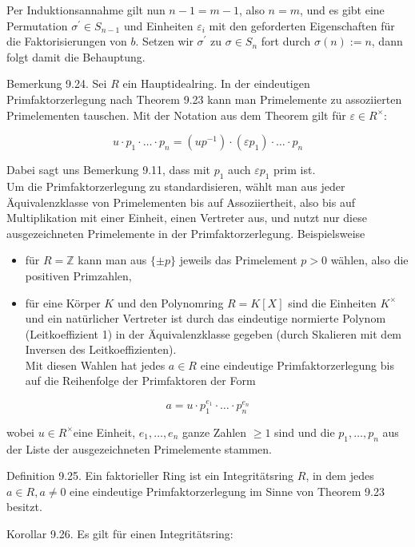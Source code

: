 \documentclass[10pt, letterpaper]{article}
\begin{document}
Per Induktionsannahme gilt nun $n-1=m-1$, also $n=m$, und es gibt eine Permutation $\sigma^{\prime} \in S_{n-1}$ und Einheiten $\varepsilon_{i}$ mit den geforderten Eigenschaften für die Faktorisierungen von $b$. Setzen wir $\sigma^{\prime}$ zu $\sigma \in S_{n}$ fort durch $\sigma(n):=n$, dann folgt damit die Behauptung.

Bemerkung 9.24. Sei $R$ ein Hauptidealring. In der eindeutigen Primfaktorzerlegung nach Theorem 9.23 kann man Primelemente zu assoziierten Primelementen tauschen. Mit der Notation aus dem Theorem gilt für $\varepsilon \in R^{\times}$:

$$
u \cdot p_{1} \cdot \ldots \cdot p_{n}=\left(u p^{-1}\right) \cdot\left(\varepsilon p_{1}\right) \cdot \ldots \cdot p_{n}
$$

Dabei sagt uns Bemerkung 9.11, dass mit $p_{1}$ auch $\varepsilon p_{1}$ prim ist.\\
Um die Primfaktorzerlegung zu standardisieren, wählt man aus jeder Äquivalenzklasse von Primelementen bis auf Assoziiertheit, also bis auf Multiplikation mit einer Einheit, einen Vertreter aus, und nutzt nur diese ausgezeichneten Primelemente in der Primfaktorzerlegung. Beispielsweise

\begin{itemize}
  \item für $R=\mathbb{Z}$ kann man aus $\{ \pm p\}$ jeweils das Primelement $p>0$ wählen, also die positiven Primzahlen,
  \item für eine Körper $K$ und den Polynomring $R=K[X]$ sind die Einheiten $K^{\times}$und ein natürlicher Vertreter ist durch das eindeutige normierte Polynom (Leitkoeffizient 1) in der Äquivalenzklasse gegeben (durch Skalieren mit dem Inversen des Leitkoeffizienten).\\
Mit diesen Wahlen hat jedes $a \in R$ eine eindeutige Primfaktorzerlegung bis auf die Reihenfolge der Primfaktoren der Form
\end{itemize}

$$
a=u \cdot p_{1}^{e_{1}} \cdot \ldots \cdot p_{n}^{e_{n}}
$$

wobei $u \in R^{\times}$eine Einheit, $e_{1}, \ldots, e_{n}$ ganze Zahlen $\geq 1$ sind und die $p_{1}, \ldots, p_{n}$ aus der Liste der ausgezeichneten Primelemente stammen.

Definition 9.25. Ein faktorieller Ring ist ein Integritätsring $R$, in dem jedes $a \in R, a \neq 0$ eine eindeutige Primfaktorzerlegung im Sinne von Theorem 9.23 besitzt.

Korollar 9.26. Es gilt für einen Integritätsring:
\end{document}
